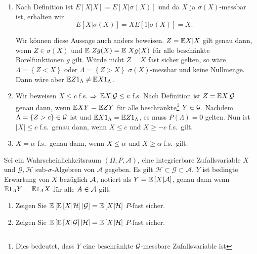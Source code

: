 \solution 
\begin{enumerate}
    \item 
        Nach Definition ist $E\left[ X| X \right]=E\left[ X|\sigma\left( X
        \right) \right]$ und da $X$ ja $\sigma\left( X \right)$-messbar ist,
        erhalten wir \begin{equation*} E\left[ X|\sigma\left( X \right)
            \right]= X E\left[ 1 | \sigma\left( X \right) \right] =X.
        \end{equation*}

        Wir können diese Aussage auch anders beweisen. $Z= \mathbb{E} X | X$ gilt genau
        dann, wenn $Z \in \sigma(X)$ und $\mathbb{E}\ Z g(X) = \mathbb{E}\ X g(X)$ für alle
        beschänkte Borelfunktionen $g$ gilt.  Würde nicht $Z = X$ fast sicher
        gelten, so wäre $\Lambda=\left\{ Z< X \right\}$ oder $\Lambda= \left\{
        Z > X \right\}$ $\sigma(X)$-messbar und keine Nullmenge. Dann wäre aber
        $\mathbb{E} Z 1_{\Lambda} \neq \mathbb{E} X 1_{\Lambda}$.
    \item Wir beweisen $X \leq c$ f.s. $\Rightarrow$ $ \mathbb{E} X | \mathcal G \leq c$ f.s. Nach
        Definition ist $Z=\mathbb{E} X|\mathcal G$ genau dann, wenn $\mathbb{E} X Y = \mathbb{E} Z Y$ für alle
        beschränkte\footnote{Dies bedeutet, dass $Y$ eine beschränkte
        $\mathcal G$-messbare Zufallsvariable ist} $Y\in \mathcal G$. Nachdem $\Lambda =
        \left\{ Z>c \right\} \in \mathcal G$ ist und $\mathbb{E} X 1_\Lambda = \mathbb{E} Z
        1_\Lambda$, es muss $P\left( \Lambda \right)=0$ gelten.  Nun ist $| X |
        \leq c$ f.s.\ genau dann, wenn $X \leq c$ und $ X \geq -c$ f.s.\ gilt.
    \item $X=\alpha$ f.s.\ genau dann, wenn $X \leq \alpha$ und $ X \geq
        \alpha$ f.s.\ gilt.
\end{enumerate}



 Sei ein
Wahrscheinlichkeitsraum $\left( \Omega, P, \mathcal A \right)$, eine
integrierbare Zufallsvariable $X$ und $\mathcal G, \mathcal H$
sub-$\sigma$-Algebren von $\mathcal A$ gegeben. Es gilt $\mathcal H \subset
\mathcal G \subset \mathcal A$. $Y$ ist bedingte Erwartung von $X$ bezüglich $\mathcal A$, notiert
als $Y = \mathbb{E} \left[ X | \mathcal A \right]$, genau dann wenn $\mathbb{E} 1_A Y = \mathbb{E} 1_A X$ für alle $A\in\mathcal A$ gilt.
\begin{enumerate}
    \item Zeigen Sie $\mathbb{E} \left[  \mathbb{E} \left[ X | \mathcal H \right] | \mathcal G \right] = \mathbb{E} \left[ X | \mathcal H \right]$ $P$-fast sicher.
    \item Zeigen Sie $\mathbb{E} \left[  \mathbb{E} \left[ X | \mathcal G \right] | \mathcal H \right] = \mathbb{E} \left[ X | \mathcal H \right]$ $P$-fast sicher.
\end{enumerate}

